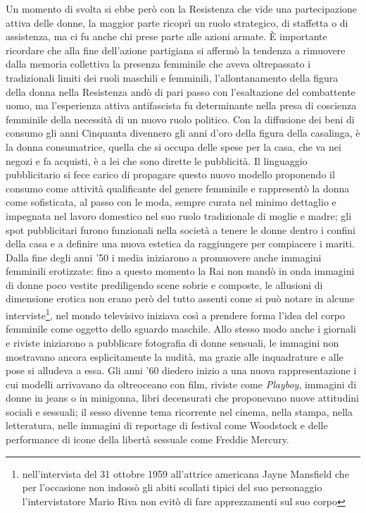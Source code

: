 Un momento di svolta si ebbe però con la Resistenza che vide una partecipazione attiva delle donne, la maggior parte ricoprì un ruolo strategico, di staffetta o di assistenza, ma ci fu anche chi prese parte alle azioni armate.
È importante ricordare che alla fine dell'azione partigiana si affermò la tendenza a rimuovere dalla memoria collettiva la presenza femminile che aveva oltrepassato i tradizionali limiti dei ruoli maschili e femminili, l'allontanamento della figura della donna nella Resistenza andò di pari passo con l'esaltazione del combattente uomo, ma l'esperienza attiva antifascista fu determinante nella presa di coscienza femminile della necessità di un nuovo ruolo politico.
Con la diffusione dei beni di consumo gli anni Cinquanta  divennero gli anni d'oro della figura della casalinga, è la donna consumatrice, quella che si occupa delle spese per la casa, che va nei negozi e fa acquisti, è a lei che sono dirette le pubblicità.
Il linguaggio pubblicitario si fece carico di propagare questo nuovo modello proponendo il consumo come attività qualificante del genere femminile e rappresentò la donna come sofisticata, al passo con le moda, sempre curata nel minimo dettaglio e impegnata nel lavoro domestico nel suo ruolo tradizionale di moglie e madre; gli spot pubblicitari furono funzionali nella società a tenere le donne dentro i confini della casa e a definire una nuova estetica da raggiungere per compiacere i mariti.
Dalla fine degli anni '50 i media iniziarono a promuovere anche immagini femminili erotizzate: fino a questo momento la Rai non mandò in onda immagini di donne poco vestite prediligendo scene sobrie e composte, le allusioni di dimensione erotica non erano però del tutto assenti come si può notare in alcune interviste\footnote{nell'intervista del 31 ottobre 1959 all'attrice americana Jayne Mansfield che per l'occasione non indossò gli abiti scollati tipici del suo personaggio l'intervistatore Mario Riva non evitò di fare apprezzamenti sul suo corpo}, nel mondo televisivo iniziava così a prendere forma l'idea del corpo femminile come oggetto dello sguardo maschile.
Allo stesso modo anche i giornali e riviste iniziarono a pubblicare fotografia di donne sensuali, le immagini non mostravano ancora esplicitamente la nudità, ma grazie alle inquadrature e alle pose si alludeva a essa.
Gli anni '60 diedero inizio a una nuova rappresentazione i cui modelli arrivavano da oltreoceano con film, riviste come \textit{Playboy}, immagini di donne in jeans o in minigonna, libri decensurati che proponevano nuove attitudini sociali e sessuali; il sesso divenne tema ricorrente nel cinema, nella stampa, nella letteratura, nelle immagini di reportage di festival come Woodstock e delle performance di icone della libertà sessuale come Freddie Mercury.
